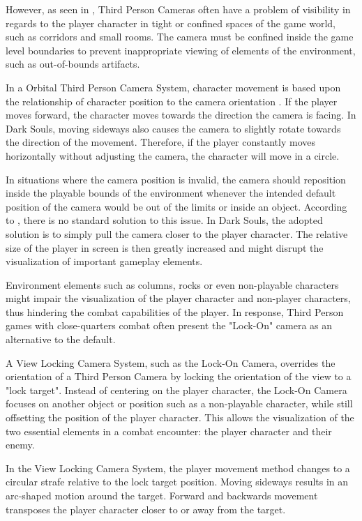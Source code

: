 \documentclass[cic,tc,english]{iiufrgs}
\begin{document}
However, as seen in \cite{BOOK_LevelUpTheGuideToGreat}, Third Person Cameras often have a problem of visibility in regards to the player character in tight or confined spaces of the game world, such as corridors and small rooms. The camera must be confined inside the game level boundaries to prevent inappropriate viewing of elements of the environment, such as  out-of-bounds artifacts.

In a Orbital Third Person Camera System, character movement is based upon the relationship of character position to the camera orientation \cite{BOOK_RealTimeCameras}. If the player moves forward, the character moves towards the direction the camera is facing. In Dark Souls, moving sideways also causes the camera to slightly rotate towards the direction of the movement. Therefore, if the player constantly moves horizontally without adjusting the camera, the character will move in a circle.

In situations where the camera position is invalid, the camera should reposition inside the playable bounds of the environment whenever the intended default position of the camera would be out of the limits or inside an object. According to \cite{BOOK_RealTimeCameras}, there is no standard solution to this issue. In Dark Souls, the adopted solution is to simply pull the camera closer to the player character. The relative size of the player in screen is then greatly increased and might disrupt the visualization of important gameplay elements. 

Environment elements such as columns, rocks or even non-playable characters might impair the visualization of the player character and non-player characters, thus hindering the combat capabilities of the player. In response, Third Person games with close-quarters combat often present the "Lock-On" camera as an alternative to the default.

A View Locking Camera System, such as the Lock-On Camera, overrides the orientation of a Third Person Camera by locking the orientation of the view to a "lock target". Instead of centering on the player character, the Lock-On Camera focuses on another object or position such as a non-playable character, while still offsetting the position of the player character. This allows the visualization of the two essential elements in a combat encounter: the player character and their enemy.

In the View Locking Camera System, the player movement method changes to a circular strafe relative to the lock target position. Moving sideways results in an arc-shaped motion around the target. Forward and backwards movement transposes the player character closer to or away from the target.
\end{document}
